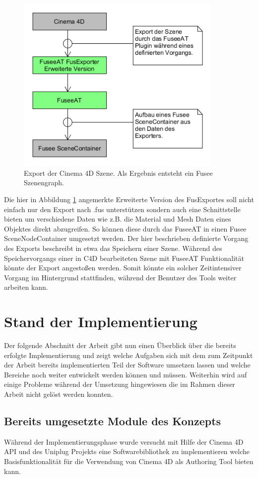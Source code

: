 \documentclass[pagesize, paper=a4, fontsize=12pt, titlepage=true, headings=small, headnosepline, abstractoff, liststotoc, nochapterprefix, plainheadsepline, twoside]{scrreprt}
\begin{document}
\begin{figure}[ht]
	\centering
	\includegraphics[width=10cm]{Bilder/Ablauf_Export_Szenengraph.png}
	\caption{Export der Cinema 4D Szene. Als Ergebnis entsteht ein Fusee Szenengraph.}
	\label{FuseeSzenenGraphExport}
\end{figure}

Die hier in Abbildung \ref{FuseeSzenenGraphExport} angemerkte Erweiterte Version des FusExportes soll nicht einfach nur den Export nach .fus unterstützen sondern auch eine Schnittstelle bieten um verschiedene Daten wie z.B. die Material und Mesh Daten eines Objektes direkt abzugreifen. So können diese durch das FuseeAT in einen Fusee SceneNodeContainer umgesetzt werden.
Der hier beschrieben definierte Vorgang des Exports beschreibt in etwa das Speichern einer Szene. Während des Speichervorgangs einer in C4D bearbeiteten Szene mit FuseeAT Funktionalität könnte der Export angestoßen werden. Somit könnte ein solcher Zeitintensiver Vorgang im Hintergrund stattfinden, während der Benutzer des Tools weiter arbeiten kann.

\section{Stand der Implementierung}
Der folgende Abschnitt der Arbeit gibt nun einen Überblick über die bereits erfolgte Implementierung und zeigt welche Aufgaben sich mit dem zum Zeitpunkt der Arbeit bereits implementierten Teil der Software umsetzen lassen und welche Bereiche noch weiter entwickelt werden können und müssen. Weiterhin wird auf einige Probleme während der Umsetzung hingewiesen die im Rahmen dieser Arbeit nicht gelöst werden konnten.

\subsection{Bereits umgesetzte Module des Konzepts}
Während der Implementierungsphase wurde versucht mit Hilfe der Cinema 4D API und des Uniplug Projekts eine Softwarebibliothek zu implementieren welche Basisfunktionalität für die Verwendung von Cinema 4D als Authoring Tool bieten kann. 
\end{document}

